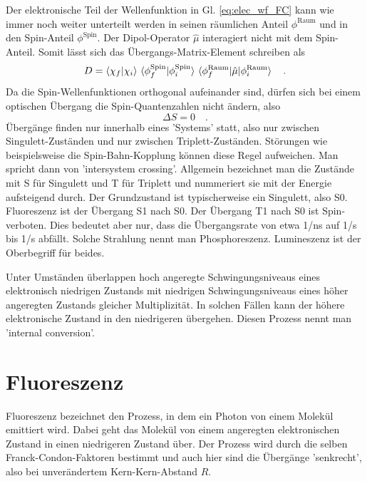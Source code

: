 Der elektronische Teil der Wellenfunktion in Gl. \ref{eq:elec_wf_FC} kann wie immer noch weiter unterteilt werden in seinen räumlichen Anteil $\phi^\text{Raum}$ und in den Spin-Anteil  $\phi^\text{Spin}$. Der Dipol-Operator $\hat{\mu}$ interagiert nicht mit dem Spin-Anteil. Somit lässt sich das Übergangs-Matrix-Element schreiben als
\begin{equation}
 D =   \braket{\chi_f | \chi_i} \,    \braket{\phi^\text{Spin}_f | \phi^\text{Spin}_i}  \,
  \braket{\phi^\text{Raum}_f | \hat{\mu} | \phi^\text{Raum}_i}  \quad .
\end{equation}
Da die Spin-Wellenfunktionen orthogonal aufeinander sind, dürfen sich bei einem optischen Übergang die Spin-Quantenzahlen nicht ändern, also
\begin{equation}
 \Delta S = 0 \quad .
\end{equation}
Übergänge finden nur innerhalb eines 'Systems' statt, also nur zwischen  Singulett-Zuständen und nur zwischen   Triplett-Zuständen.
Störungen wie beispielsweise die Spin-Bahn-Kopplung können diese Regel aufweichen. Man spricht dann von 'intersystem crossing'.
Allgemein bezeichnet man die Zustände  mit S für Singulett und T für Triplett und nummeriert sie mit der Energie aufsteigend durch. Der Grundzustand ist typischerweise ein Singulett, also S0. Fluoreszenz ist der Übergang S1 nach S0. Der Übergang T1 nach S0 ist Spin-verboten. Dies bedeutet aber nur, dass die Übergangsrate von etwa 1/ns auf 1/\textmu s bis 1/s abfällt. Solche Strahlung nennt man Phosphoreszenz. Lumineszenz ist der Oberbegriff für beides. 

Unter Umständen überlappen hoch angeregte Schwingungsniveaus eines elektronisch niedrigen Zustands mit niedrigen Schwingungsniveaus eines höher angeregten Zustands gleicher Multiplizität. In solchen Fällen kann der höhere elektronische Zustand in den niedrigeren übergehen. Diesen Prozess nennt man 'internal conversion'.


\section{Fluoreszenz}

Fluoreszenz bezeichnet den Prozess, in dem ein Photon von einem Molekül emittiert wird. Dabei geht das Molekül von einem angeregten elektronischen Zustand in einen niedrigeren Zustand über. Der Prozess wird durch die selben Franck-Condon-Faktoren bestimmt und auch hier sind die Übergänge 'senkrecht', also bei unverändertem Kern-Kern-Abstand $R$.

